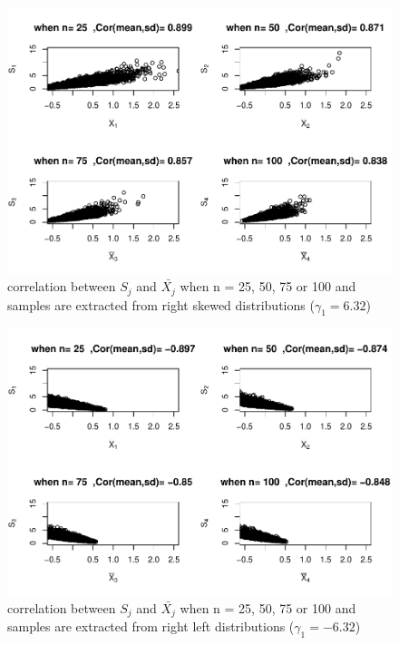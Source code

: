 \documentclass[
  man]{apa6}
\begin{document}
\begin{figure}
\centering
\includegraphics{Correlations-between-the-sample-means-difference-and-standardizers-of-all-estimators,-and-implications-on-biases-and-variances-of-all-estimators_files/figure-latex/Homunbalcorasafctofn1-1.pdf}
\caption{\label{fig:Homunbalcorasafctofn1}correlation between \(S_j\) and \(\bar{X_j}\) when n = 25, 50, 75 or 100 and samples are extracted from right skewed distributions (\(\gamma_1 = 6.32\))}
\end{figure}

\begin{figure}
\centering
\includegraphics{Correlations-between-the-sample-means-difference-and-standardizers-of-all-estimators,-and-implications-on-biases-and-variances-of-all-estimators_files/figure-latex/Homunbalcorasafctofn2-1.pdf}
\caption{\label{fig:Homunbalcorasafctofn2}correlation between \(S_j\) and \(\bar{X_j}\) when n = 25, 50, 75 or 100 and samples are extracted from right left distributions (\(\gamma_1 = -6.32\))}
\end{figure}
\end{document}
